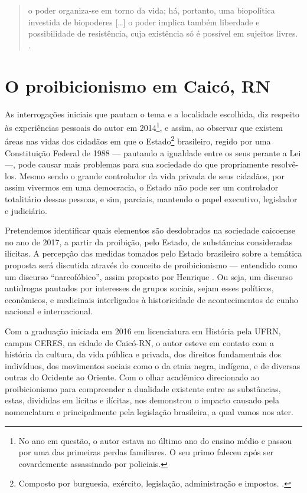 \begin{refsection}
    \begin{quotation}
        o poder organiza-se em torno da vida; há, portanto, uma biopolítica investida de biopoderes [\dots] o poder implica também liberdade e possibilidade de resistência, cuja existência só é possível em sujeitos livres. \cite[p.~52]{Fernandes2012Discurso}.
    \end{quotation}

    \section{O proibicionismo em Caicó, RN}

    As interrogações iniciais que pautam o tema e a localidade escolhida, diz respeito às experiências pessoais do autor em 2014\footnote{No ano em questão, o autor estava no último ano do ensino médio e passou por uma das primeiras perdas familiares. O seu primo faleceu após ser covardemente assassinado por policiais.}, e assim, ao observar que existem áreas nas vidas dos cidadãos em que o Estado\footnote{Composto por burguesia, exército, legislação, administração e impostos. \cite{Koselleck2006Futuro}.} brasileiro, regido por uma Constituição Federal de 1988 --- pautando a igualdade entre os seus perante a Lei ---, pode causar mais problemas para sua sociedade do que propriamente resolvê-los. Mesmo sendo o grande controlador da vida privada de seus cidadãos, por assim vivermos em uma democracia, o Estado não pode ser um controlador totalitário dessas pessoas, e sim, parciais, mantendo o papel executivo, legislador e judiciário.

    Pretendemos identificar quais elementos são desdobrados na sociedade caicoense no ano de 2017, a partir da proibição, pelo Estado, de substâncias consideradas ilícitas. A percepção das medidas tomados pelo Estado brasileiro sobre a temática proposta será discutida através do conceito de proibicionismo --- entendido como um discurso ``narcofóbico'', assim proposto por Henrique \textcite{Carneiro2018Drogas}. Ou seja, um discurso antidrogas pautados por interesses de grupos sociais, sejam esses políticos, econômicos, e medicinais interligados à historicidade de acontecimentos de cunho nacional e internacional.

    Com a graduação iniciada em 2016 em licenciatura em História pela UFRN, campus CERES, na cidade de Caicó-RN, o autor esteve em contato com a história da cultura, da vida pública e privada, dos direitos fundamentais dos indivíduos, dos movimentos sociais como o da etnia negra, indígena, e de diversas outras do Ocidente ao Oriente. Com o olhar acadêmico direcionado ao proibicionismo para compreender a dualidade existente entre as substâncias, estas, divididas em lícitas e ilícitas, nos demonstrou o impacto causado pela nomenclatura e principalmente pela legislação brasileira, a qual vamos nos ater. 


\end{refsection}
